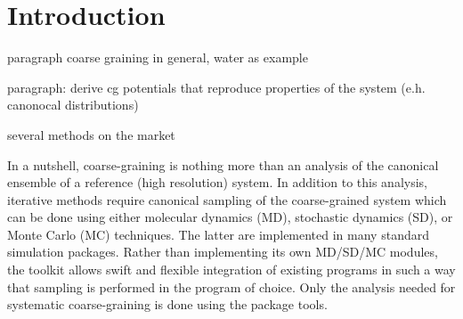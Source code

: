 \chapter{Introduction}
paragraph coarse graining in general, water as example

paragraph: derive cg potentials that reproduce properties of the system (e.h. canonocal distributions)

several methods on the market 

In a nutshell, coarse-graining is nothing more than an analysis of the canonical ensemble of a reference (high resolution) system. In addition to this analysis, iterative methods require canonical sampling of the coarse-grained system which can be done using either molecular dynamics (MD), stochastic dynamics (SD), or Monte Carlo (MC) techniques. The latter are implemented in many standard simulation packages. Rather than implementing its own MD/SD/MC modules, the toolkit allows swift and flexible integration of existing  programs in such a way that sampling is performed in the program of choice. Only the analysis needed for systematic coarse-graining is done using the package tools.
